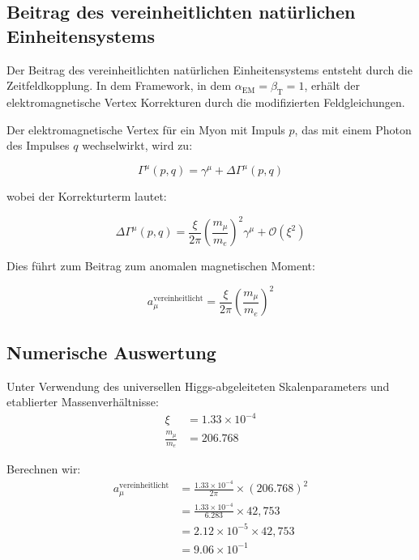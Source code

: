 \documentclass[12pt,a4paper]{article}
\newcommand{\alphaEM}{\alpha_{\text{EM}}}
\newcommand{\betaT}{\beta_{\text{T}}}
\newcommand{\xipar}{\xi}
\begin{document}
	\subsection{Beitrag des vereinheitlichten natürlichen Einheitensystems}
	
	Der Beitrag des vereinheitlichten natürlichen Einheitensystems entsteht durch die Zeitfeldkopplung. In dem Framework, in dem $\alphaEM = \betaT = 1$, erhält der elektromagnetische Vertex Korrekturen durch die modifizierten Feldgleichungen.
	
	Der elektromagnetische Vertex für ein Myon mit Impuls $p$, das mit einem Photon des Impulses $q$ wechselwirkt, wird zu:
	
	\begin{equation}
		\Gamma^{\mu}(p,q) = \gamma^{\mu} + \Delta\Gamma^{\mu}(p,q)
	\end{equation}
	
	wobei der Korrekturterm lautet:
	
	\begin{equation}
		\Delta\Gamma^{\mu}(p,q) = \frac{\xipar}{2\pi}\left(\frac{m_\mu}{m_e}\right)^2\gamma^{\mu} + \mathcal{O}(\xipar^2)
	\end{equation}
	
	Dies führt zum Beitrag zum anomalen magnetischen Moment:
	
	\begin{equation}
		a_\mu^{\text{vereinheitlicht}} = \frac{\xipar}{2\pi}\left(\frac{m_\mu}{m_e}\right)^2
	\end{equation}
	
	\subsection{Numerische Auswertung}
	
	Unter Verwendung des universellen Higgs-abgeleiteten Skalenparameters und etablierter Massenverhältnisse:
	\begin{align}
		\xipar &= 1.33 \times 10^{-4} \\
		\frac{m_\mu}{m_e} &= 206.768
	\end{align}
	
	Berechnen wir:
	\begin{align}
		a_\mu^{\text{vereinheitlicht}} &= \frac{1.33 \times 10^{-4}}{2\pi} \times (206.768)^2 \\
		&= \frac{1.33 \times 10^{-4}}{6.283} \times 42,753 \\
		&= 2.12 \times 10^{-5} \times 42,753 \\
		&= 9.06 \times 10^{-1}
	\end{align}
	
\end{document}
